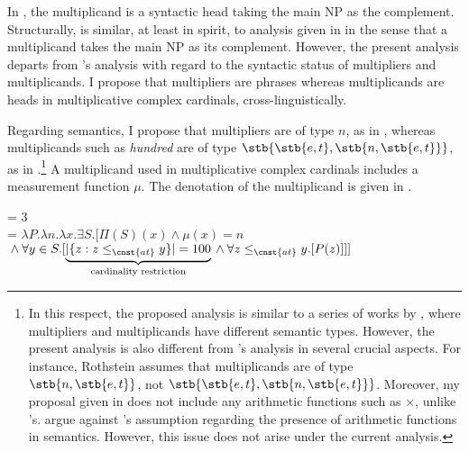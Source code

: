 \documentclass[output=paper]{langscibook}
\begin{document}
In , the multiplicand is a syntactic head taking the main NP as the complement. Structurally,  is similar, at least in spirit, to  analysis given in  in the sense that a multiplicand takes the main NP as its complement. However, the present analysis departs from \citeauthor{IoninMatushansky2018}'s analysis with regard to the syntactic status of multipliers and multiplicands. I propose that multipliers are phrases whereas multiplicands are heads in multiplicative complex cardinals, cross-linguistically.

\begin{sloppypar}
Regarding semantics, I propose that multipliers are of type $n$, as in , whereas multiplicands such as \textit{hundred} are of type $\stb{\stb{e,t},\stb{n,\stb{e,t}}}$, as in .\footnote{In this respect, the proposed analysis is similar to a series of works by \citet{Rothstein2013, Rothstein2017}, where multipliers and multiplicands have different semantic types. However, the present analysis is also different from \citeauthor{Rothstein2013}'s analysis in several crucial aspects. For instance, Rothstein assumes that multiplicands are of type $\stb{n,\stb{e,t}}$, not $\stb{\stb{e,t},\stb{n,\stb{e,t}}}$. Moreover, my proposal given in  does not include any arithmetic functions such as $\times$, unlike \citeauthor{Rothstein2013}'s. \citeauthor{IoninMatushansky2018} argue against \citeauthor{Rothstein2013}'s assumption regarding the presence of arithmetic functions in semantics. However, this issue does not arise under the current analysis.} A multiplicand used in multiplicative complex cardinals includes a measurement function $\mu$. The denotation of the multiplicand  is given in .\end{sloppypar}

\ea
\ea\label{tat:mulp}  = 3
\ex\label{tat:mulc} \\
= $\lambda P.\lambda n.\lambda x.\exists S.[\Pi(S)(x) \wedge \mu(x)=n$\\ \hspace*{\fill}${}\wedge \forall y \in S.[
\underbrace{\vert\{z: z\leq_{\cnst{at}}y\}\vert = 100}_{\text{cardinality restriction}}
{}\wedge\forall z\leq_{\cnst{at}}y.[P(z)]]]$
\z
\z
\end{document}
